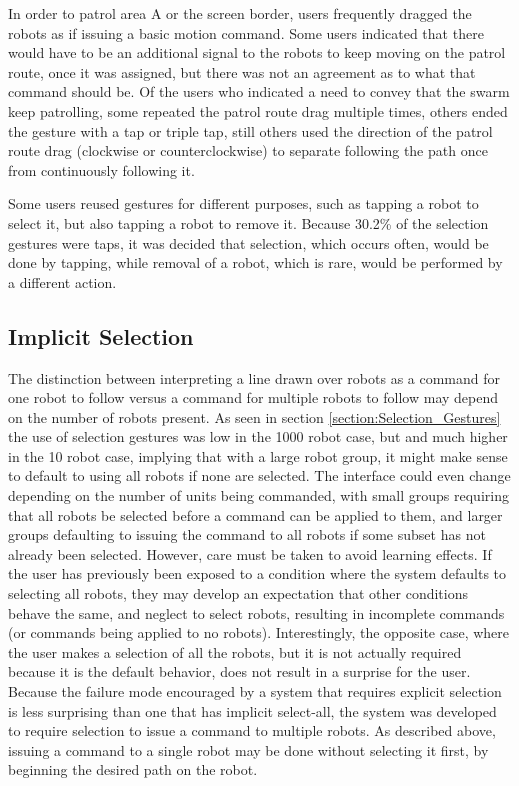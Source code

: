 In order to patrol area A or the screen border, users frequently dragged the robots as if issuing a basic motion command. 
Some users indicated that there would have to be an additional signal to the robots to keep moving on the patrol route, once it was assigned, but there was not an agreement as to what that command should be. 
Of the users who indicated a need to convey that the swarm keep patrolling, some repeated the patrol route drag multiple times, others ended the gesture with a tap or triple tap, still others used the direction of the patrol route drag (clockwise or counterclockwise) to separate following the path once from continuously following it. 

Some users reused gestures for different purposes, such as tapping a robot to select it, but also tapping a robot to remove it.
Because 30.2\% of the selection gestures were taps, it was decided that selection, which occurs often, would be done by tapping, while removal of a robot, which is rare, would be performed by a different action. 

\subsection{Implicit Selection}

The distinction between interpreting a line drawn over robots as a command for one robot to follow versus a command for multiple robots to follow may depend on the number of robots present.
As seen in section \ref{section:Selection_Gestures} the use of selection gestures was low in the 1000 robot case, but and much higher in the 10 robot case, implying that with a large robot group, it might make sense to default to using all robots if none are selected. 
The interface could even change depending on the number of units being commanded, with small groups requiring that all robots be selected before a command can be applied to them, and larger groups defaulting to issuing the command to all robots if some subset has not already been selected. 
However, care must be taken to avoid learning effects. 
If the user has previously been exposed to a condition where the system defaults to selecting all robots, they may develop an expectation that other conditions behave the same, and neglect to select robots, resulting in incomplete commands (or commands being applied to no robots). 
Interestingly, the opposite case, where the user makes a selection of all the robots, but it is not actually required because it is the default behavior, does not result in a surprise for the user. 
Because the failure mode encouraged by a system that requires explicit selection is less surprising than one that has implicit select-all, the system was developed to require selection to issue a command to multiple robots. 
As described above, issuing a command to a single robot may be done without selecting it first, by beginning the desired path on the robot. 

